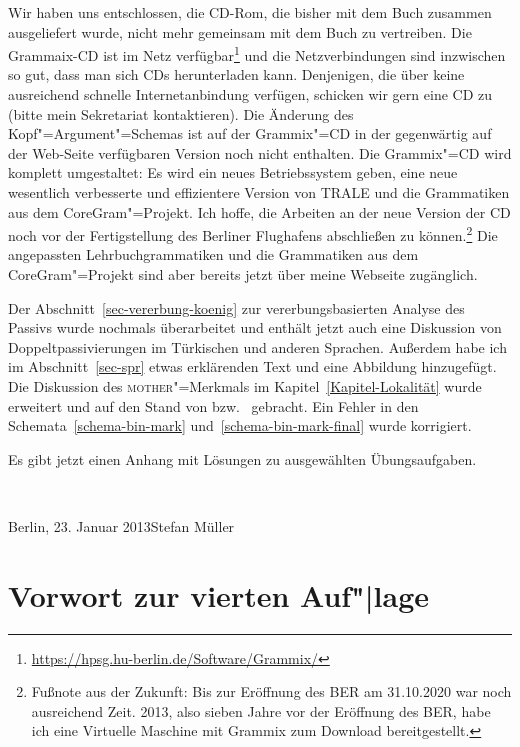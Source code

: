 Wir haben uns entschlossen, die CD-Rom, die bisher mit dem Buch zusammen ausgeliefert wurde, nicht
mehr gemeinsam mit dem Buch zu vertreiben. Die Grammaix-CD \citep{Mueller2007b} ist im Netz verfügbar\footnote{
  \url{https://hpsg.hu-berlin.de/Software/Grammix/}
} und die Netzverbindungen sind inzwischen so gut, dass man sich CDs herunterladen kann. Denjenigen,
die über keine ausreichend schnelle Internetanbindung verfügen, schicken wir gern eine CD zu (bitte
mein Sekretariat kontaktieren). 
Die Änderung des Kopf"=Argument"=Schemas ist auf der Grammix"=CD in der gegenwärtig auf der
Web-Seite verfügbaren Version noch nicht enthalten. Die Grammix"=CD
wird komplett umgestaltet: Es wird ein neues Betriebssystem geben, eine neue wesentlich verbesserte
und effizientere Version von TRALE und die Grammatiken aus dem CoreGram"=Projekt. Ich hoffe, die
Arbeiten an der neue Version der CD noch vor der Fertigstellung des Berliner Flughafens abschließen
zu können.\footnote{Fußnote aus der Zukunft: Bis zur Eröffnung des BER am 31.10.2020 war noch
  ausreichend Zeit. 2013, also sieben Jahre vor der Eröffnung des BER, habe ich eine Virtuelle
  Maschine mit Grammix zum Download bereitgestellt.} Die angepassten Lehrbuchgrammatiken und die Grammatiken aus dem CoreGram"=Projekt sind
aber bereits jetzt über meine Webseite zugänglich.

Der Abschnitt~\ref{sec-vererbung-koenig} zur vererbungsbasierten Analyse des Passivs wurde nochmals
überarbeitet und enthält jetzt auch eine Diskussion von Doppeltpassivierungen im Türkischen und
anderen Sprachen. Außerdem habe ich im Abschnitt~\ref{sec-spr} etwas erklärenden Text und eine
Abbildung hinzugefügt. Die Diskussion des \textsc{mother}"=Merkmals im Kapitel~\ref{Kapitel-Lokalität} wurde erweitert und auf
den Stand von  bzw.\  gebracht. 
Ein Fehler in den Schemata~\ref{schema-bin-mark} und~\ref{schema-bin-mark-final} wurde korrigiert.

Es gibt jetzt einen Anhang mit Lösungen zu ausgewählten Übungsaufgaben.


~\medskip

\noindent
Berlin, 23. Januar 2013\hfill Stefan Müller


\section*{Vorwort zur vierten Auf"|lage}

